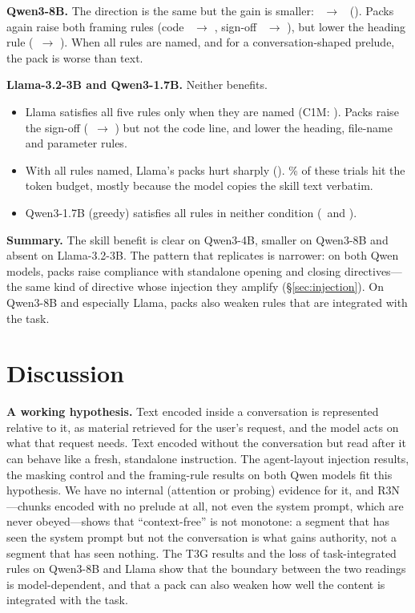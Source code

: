 \documentclass[10pt]{article}
\newcommand{\cond}[1]{\textsf{#1}}
\begin{document}
\textbf{Qwen3-8B.} The direction is the same but the gain is smaller: \WtwoEightCone\ $\rightarrow$ \WtwoEightCthree\ (\WtwoEightDthree).
Packs again raise both framing rules (code \WtwoEightCodeCone\ $\rightarrow$ \WtwoEightCodeCthree, sign-off \WtwoEightSignCone\
$\rightarrow$ \WtwoEightSignCthree), but lower the heading rule (\WtwoEightHeadCone\ $\rightarrow$ \WtwoEightHeadCthree). When all
rules are named, and for a conversation-shaped prelude, the pack is worse than text.

\textbf{Llama-3.2-3B and Qwen3-1.7B.} Neither benefits.
\begin{itemize}\itemsep0pt
\item Llama satisfies all five rules only when they are named (\cond{C1M}: \WtwoLlamaConeM). Packs raise the sign-off
  (\WtwoLlamaSignCone\ $\rightarrow$ \WtwoLlamaSignCthree) but not the code line, and lower the heading, file-name and parameter rules.
\item With all rules named, Llama's packs hurt sharply (\WtwoLlamaDMM). \WtwoLlamaTruncCthreeM\% of these trials hit the token budget,
  mostly because the model copies the skill text verbatim.
\item Qwen3-1.7B (greedy) satisfies all rules in neither condition (\WoneOneSevenCone\ and \WoneOneSevenCthree).
\end{itemize}

\textbf{Summary.} The skill benefit is clear on Qwen3-4B, smaller on Qwen3-8B and absent on Llama-3.2-3B. The pattern that
replicates is narrower: on both Qwen models, packs raise compliance with standalone opening and closing directives---the same kind of
directive whose injection they amplify (\S\ref{sec:injection}). On Qwen3-8B and especially Llama, packs also weaken rules that are
integrated with the task.

\section{Discussion}
\textbf{A working hypothesis.} Text encoded inside a conversation is represented relative to it, as material retrieved for the user's
request, and the model acts on what that request needs. Text encoded without the conversation but read after it can behave like a
fresh, standalone instruction. The agent-layout injection results, the masking control and the framing-rule results on both Qwen models fit
this hypothesis. We have no internal (attention or probing) evidence for it, and \cond{R3N}---chunks encoded with no prelude at all,
not even the system prompt, which are never obeyed---shows that ``context-free'' is not monotone: a segment that has seen the system
prompt but not the conversation is what gains authority, not a segment that has seen nothing. The \cond{T3G} results and the loss of task-integrated rules on Qwen3-8B
and Llama show that the boundary between the two readings is model-dependent, and that a pack can also weaken how well the content
is integrated with the task.
\end{document}
